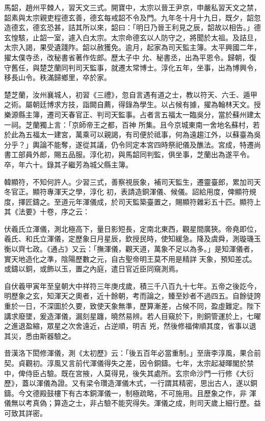 \begin{pinyinscope}
 馬韶，趙州平棘人，習天文三式。開寶中，太宗以晉王尹京，申嚴私習天文之禁，韶素與太宗親吏程德玄善，德玄每戒韶不令及門。九年冬十月十九日，既夕，韶忽造德玄，德玄恐甚，詰其所以來，韶曰：「明日乃晉王利見之辰，韶故以相告。」德玄惶駭，止韶一室，遽入白太宗。太宗命德玄以人防守之，將聞於太祖。及詰旦，太宗入謁，果受遺踐阼。韶以赦獲免。逾月，起家為司天監主簿。太平興國二年，擢太僕寺丞，改秘書省著作佐郎。歷太子中
 允、秘書丞，出為平恩令。歸朝，復守舊任，與楚芝蘭同判司天監事，就遷太常博士。淳化五年，坐事，出為博興令，移長山令。秩滿歸鄉里，卒於家。



 楚芝蘭，汝州襄城人，初習《三禮》，忽自言遇有道之士，教以符天、六壬、遁甲之術。屬朝廷博求方技，詣闕自薦，得錄為學生。以占候有據，擢為翰林天文。授樂源縣主簿，遷司天春官正、判司天監事。占者言五福太一臨吳分，當於蘇州建太一祠。芝蘭獨上言：「京師帝王之都，百神
 所集。且今京城東南一舍地名蘇村，若於此為五福太一建宮，萬乘可以親謁，有司便於祗事，何為遠趨江外，以蘇臺為吳分乎？」輿論不能奪，遂從其議，仍令同定本宮四時祭祀儀及醮法。宮成，特遷尚書工部員外郎，賜五品服。淳化初，與馬韶同判監，俱坐事，芝蘭出為遂平令。卒，年六十。錄其子繼芳為城父縣主簿。



 韓顯符，不知何許人。少習三式，善察視辰象，補司天監生，遷靈臺郎，累加司天冬官正。顯符專渾天之學，淳化
 初，表請造銅渾儀、候儀。詔給用度，俾顯符規度，擇匠鑄之。至道元年渾儀成，於司天監築臺置之，賜顯符雜彩五十匹。顯符上其《法要》十卷，序之云：



 伏羲氏立渾儀，測北極高下，量日影短長，定南北東西，觀星間廣狹。帝堯即位，羲氏、和氏立渾儀，定歷象日月星辰，欽授民時，使知緩急。降及虞舜，測璇璣玉衡以齊七政。《通占》又云：「撫渾儀，觀天道，萬象不足以為多。」是知渾儀者，實天地造化之準，陰陽歷數之元，自古聖帝明王莫不用是精詳
 天象，預知差忒。或鑄以銅，或飾以玉，置之內庭，遣日官近臣同窺測焉。



 自伏羲甲寅年至皇朝大中祥符三年庚戌歲，積三千八百九十七年。五帝之後訖今，明歷象之玄，知渾天之奧者，近十餘朝，考而論之，臻至妙者不過四五。自餘徒誇重於一日，不深圖於久要，致使天象無準，歷算漸差，占候不同，盈虛難定。陛下講求廢墜，爰造渾儀，漏刻星躔，曉然易辨。若人目窺於下，則銅管運於上，七曜之進退盈縮，眾星之次舍遠近，占逆順，明吉
 兇，然後修福俾順其度，省事以退其災，悉由斯器驗之。



 昔漢洛下閎修渾儀，測《太初歷》云：「後五百年必當重制。」至唐李淳風，果合前契。貞觀初。淳風又言前代渾儀得失之差，因令銅鑄。七年，太宗起凝暉閣於禁中，俾侍臣占驗。既在宮掖，人莫得見，後失其處所。玄宗命沙門一行修《大衍歷》，蓋以渾儀為證。又有梁令瓚造渾儀木式，一行謂其精密，思出古人，遂以銅鑄。今文德殿鼓樓下有古本銅渾儀一，制極疏略，不可施用。且歷象之作，非
 渾儀無以考真偽；算造之士，非占驗不能究得失。渾儀之成，則司天歲上細行歷。益可致其詳密。




\end{pinyinscope}
